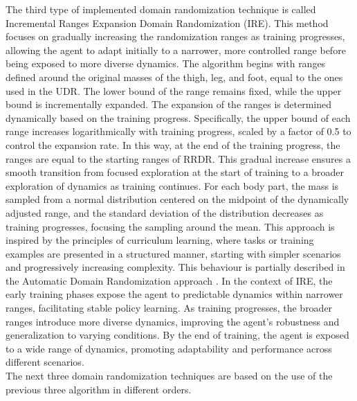 \documentclass[11pt]{article}
\begin{document}
The third type of implemented domain randomization technique is called Incremental Ranges Expansion Domain Randomization (IRE). This method focuses on gradually increasing the randomization ranges as training progresses, allowing the agent to adapt initially to a narrower, more controlled range before being exposed to more diverse dynamics. The algorithm begins with ranges defined around the original masses of the thigh, leg, and foot, equal to the ones used in the UDR. The lower bound of the range remains fixed, while the upper bound is incrementally expanded. The expansion of the ranges is determined dynamically based on the training progress. Specifically, the upper bound of each range increases logarithmically with training progress, scaled by a factor of 0.5 to control the expansion rate. In this way, at the end of the training progress, the ranges are equal to the starting ranges of RRDR. This gradual increase ensures a smooth transition from focused exploration at the start of training to a broader exploration of dynamics as training continues. For each body part, the mass is sampled from a normal distribution centered on the midpoint of the dynamically adjusted range, and the standard deviation of the distribution decreases as training progresses, focusing the sampling around the mean. This approach is inspired by the principles of curriculum learning, where tasks or training examples are presented in a structured manner, starting with simpler scenarios and progressively increasing complexity. This behaviour is partially described in the Automatic Domain Randomization approach \cite{Akkaya2020}. In the context of IRE, the early training phases expose the agent to predictable dynamics within narrower ranges, facilitating stable policy learning. As training progresses, the broader ranges introduce more diverse dynamics, improving the agent's robustness and generalization to varying conditions. By the end of training, the agent is exposed to a wide range of dynamics, promoting adaptability and performance across different scenarios.\\

The next three domain randomization techniques are based on the use of the previous three algorithm in different orders.\\
\end{document}
